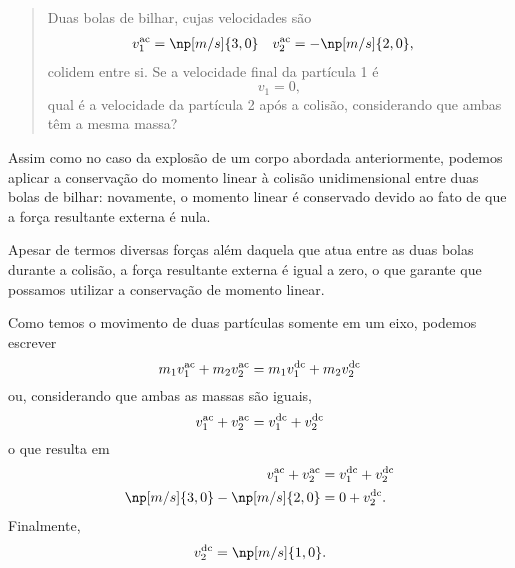 \begin{quote}
    Duas bolas de bilhar, cujas velocidades são
\begin{align*}
    v_1^{\rm{ac}} &= \np[m/s]{3,0} & v_2^{\rm{ac}} &= -\np[m/s]{2,0},
\end{align*}
%
colidem entre si. Se a velocidade final da partícula 1 é
\begin{equation}
    v_1 = 0,
\end{equation}
%
qual é a velocidade da partícula 2 após a colisão, considerando que ambas têm a mesma massa?
\end{quote}

Assim como no caso da explosão de um corpo abordada anteriormente, podemos aplicar a conservação do momento linear à colisão unidimensional entre duas bolas de bilhar: novamente, o momento linear é conservado devido ao fato de que a força resultante externa é nula.
%
\begin{marginfigure}[4cm]
\centering
{}
\caption{Apesar de termos diversas forças além daquela que atua entre as duas bolas durante a colisão, a força resultante externa é igual a zero, o que garante que possamos utilizar a conservação de momento linear.}
\end{marginfigure}

Como temos o movimento de duas partículas somente em um eixo, podemos escrever
\begin{equation}
        m_1 v_1^{\rm{ac}} + m_2 v_2^{\rm{ac}} = m_1 v_1^{\rm{dc}} + m_2 v_2^{\rm{dc}}
\end{equation}
%
ou, considerando que ambas as massas são iguais,
\begin{equation}
        v_1^{\rm{ac}} + v_2^{\rm{ac}} = v_1^{\rm{dc}} + v_2^{\rm{dc}}
\end{equation}
%
o que resulta em
\begin{align}
    v_1^{\rm{ac}} + v_2^{\rm{ac}} &= v_1^{\rm{dc}} + v_2^{\rm{dc}} \\
    \np[m/s]{3,0} - \np[m/s]{2,0} &= 0 + v_2^{\rm{dc}}.
\end{align}
%
Finalmente,
\begin{equation}
    v_2^{\rm{dc}} = \np[m/s]{1,0}.
\end{equation}

